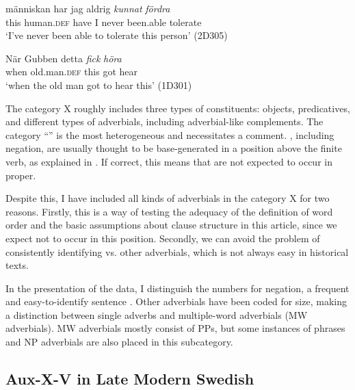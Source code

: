\documentclass[output=paper, colorlinks, citecolor=brown]{langscibook}
\begin{document}
\ea
\label{ex:sangfelt:25} %
\ea\label{ex:sangfelt:25a} 
 {människan} har jag aldrig \textit{kunnat} \textit{fördra} \\
 this human.\textsc{def} have I never been.able tolerate\\
\glt ‘I’ve never been able to tolerate this person’ (2D305)

\ex\label{ex:sangfelt:25b} 
\gll När Gubben {detta} \textit{fick} \textit{höra} \\
 when old.man.\textsc{def} this got hear\\
\glt ‘when the old man got to hear this’ (1D301)
\z
\z

\begin{sloppypar}
The category X roughly includes three types of constituents: objects, predicatives, and different types of adverbials, including adverbial-like complements. The category “” is the most heterogeneous and necessitates a comment. , including negation, are usually thought to be base-generated in a position above the finite verb, as explained in . If correct, this means that  are not expected to occur in  proper.
\end{sloppypar}

Despite this, I have included all kinds of adverbials in the category X for two reasons. Firstly, this is a way of testing the adequacy of the definition of  word order and the basic assumptions about clause structure in this article, since we expect  not to occur in this position. Secondly, we can avoid the problem of consistently identifying  vs. other adverbials, which is not always easy in historical texts.



In the presentation of the data, I distinguish the numbers for negation, a frequent and easy-to-identify sentence . Other adverbials have been coded for size, making a distinction between single adverbs and multiple-word adverbials (MW adverbials). MW adverbials mostly consist of PPs, but some instances of  phrases and NP adverbials are also placed in this subcategory.


\subsection{Aux-X-V in Late Modern Swedish}\label{sec:sangfelt:4.2}
\end{document}
